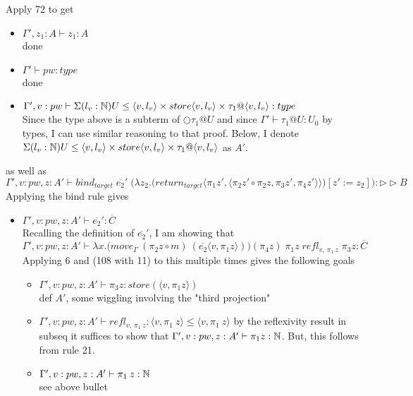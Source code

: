 \message{ !name(paper.tex)}\documentclass{article}
\begin{document}
\begin{itemize}
\begin{itemize}
Apply 72 to get
\begin{itemize}
    \item $\Gamma', z_1: A \vdash z_1 : A$\\
done
    \item $\Gamma' \vdash pw: type$\\
    done
    \item $\Gamma', v: pw \vdash \Sigma(l_v : \mathbb{N})U \leq \langle v, l_v\rangle \times store\langle v, l_v\rangle \times \tau_1@\langle v, l_v\rangle : type$\\
    Since the type above is a subterm of $\bigcirc \tau_1 @ U$ and since $\Gamma' \vdash \tau_1 @ U : U_0$ by types, I can use similar reasoning to that proof. Below, I denote
 $\Sigma(l_v : \mathbb{N})U \leq \langle v, l_v\rangle \times store\langle v, l_v\rangle \times \tau_1@\langle v, l_v\rangle$ as $A'$.
 \end{itemize}
as well as \[\Gamma', v: pw, z:A'  \vdash  bind_{target} \; \overline{e_2}'
\; \big(\lambda z_2. \big(return_{target}\langle \pi_1 z', \langle \pi_2 z' \circ \pi_2 z, \pi_3 z', \pi_4 z' \rangle \rangle \big)[z' := z_2]\big) : \rhd \rhd B\]
Applying the bind rule gives 
\begin{itemize}
    \item $\Gamma', v: pw, z:A'  \vdash \overline{e_2}' : \overline{C}$\\
    Recalling the definition of $\overline{e_2}'$, I am showing that 
    \[\Gamma', v: pw, z:A'  \vdash  \lambda x. \big(move_{\Gamma} \: (\pi_2 z \circ m) \: (\overline{e_2}\langle v,  \pi_1 z \rangle) \big) (\pi_4 z) \; \pi_1 z \; refl_{v, \: \pi_1 \: z} \; \pi_3 z : \overline{C}\]
    Applying 6 and (108 with 11) to this multiple times gives the following goals 
    \begin{itemize}
        \item $\Gamma', v: pw, z:A'  \vdash \pi_3 z : store(\langle v, \pi_1 z \rangle)$\\
        def $A'$, some wiggling involving the "third projection"
        \item $\Gamma', v: pw, z:A'  \vdash refl_{v, \: \pi_1 \: z} : \langle v, \pi_1 \: z \rangle \leq \langle v, \pi_1 \: z \rangle $
        by the reflexivity result in subseq it suffices to show that $\Gamma', v: pw, z:A' \vdash \pi_1 z : \mathbb{N}$. But, this follows from rule 21.
        \item $\Gamma', v: pw, z:A'  \vdash \pi_1 \: z : \mathbb{N} $\\
        see above bullet
    \end{itemize}

\end{itemize}
\end{itemize}
\end{itemize}
\end{document}
